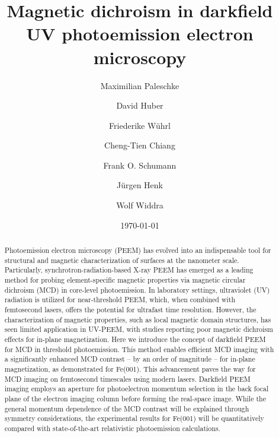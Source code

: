 \documentclass[prl,twocolumn,floatfix,superscriptaddress,aps]{revtex4-2}
\begin{document}
\title{Magnetic dichroism in darkfield UV photoemission electron microscopy}
\author{Maximilian Paleschke}
\author{David Huber}
\author{Friederike Wührl}

\author{Cheng-Tien Chiang}

\author{Frank O. Schumann}

\author{Jürgen Henk}
\author{Wolf Widdra}


\date{\today}

\begin{abstract}
    Photoemission electron microscopy (PEEM) has evolved into an indispensable tool for structural and magnetic characterization of surfaces at the nanometer scale. Particularly, synchrotron-radiation-based X-ray PEEM has emerged as a leading method for probing element-specific magnetic properties via magnetic circular dichroism (MCD) in core-level photoemission. In laboratory settings, ultraviolet (UV) radiation is utilized for near-threshold PEEM, which, when combined with femtosecond lasers, offers the potential for ultrafast time resolution. However, the characterization of magnetic properties, such as local magnetic domain structures, has seen limited application in UV-PEEM, with studies reporting poor magnetic dichroism effects for in-plane magnetization. Here we introduce the concept of darkfield PEEM for MCD in threshold photoemission. This method enables efficient MCD imaging with a significantly enhanced MCD contrast -- by an order of magnitude -- for in-plane magnetization, as demonstrated for Fe(001). This advancement paves the way for MCD imaging on femtosecond timescales using modern lasers. Darkfield PEEM imaging employs an aperture for photoelectron momentum selection in the back focal plane of the electron imaging column before forming the real-space image. While the general momentum dependence of the MCD contrast will be explained through symmetry considerations, the experimental results for Fe(001) will be quantitatively compared with state-of-the-art relativistic photoemission calculations.
\end{abstract}
\end{document}
